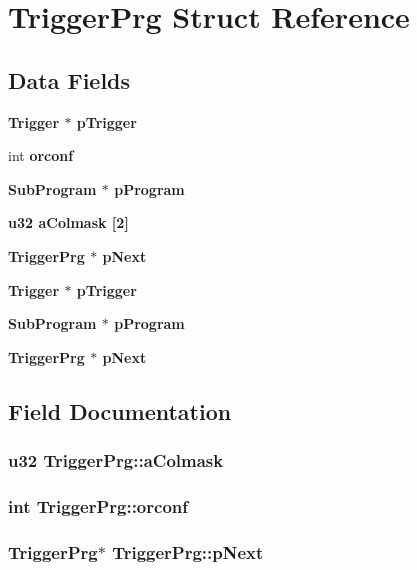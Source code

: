 \section{Trigger\-Prg Struct Reference}
\label{structTriggerPrg}
\subsection*{Data Fields}
\begin{CompactItemize}
\item 
\bf{Trigger} $\ast$ \bf{p\-Trigger}
\item 
int \bf{orconf}
\item 
\bf{Sub\-Program} $\ast$ \bf{p\-Program}
\item 
\bf{u32} \bf{a\-Colmask} [2]
\item 
\bf{Trigger\-Prg} $\ast$ \bf{p\-Next}
\item 
\bf{Trigger} $\ast$ \bf{p\-Trigger}
\item 
\bf{Sub\-Program} $\ast$ \bf{p\-Program}
\item 
\bf{Trigger\-Prg} $\ast$ \bf{p\-Next}
\end{CompactItemize}


\subsection{Field Documentation}
\subsubsection{\setlength{\rightskip}{0pt plus 5cm}\bf{u32} \bf{Trigger\-Prg::a\-Colmask}}\label{structTriggerPrg_6c5df8b228de3e02e3f84b711b8be34f}


\subsubsection{\setlength{\rightskip}{0pt plus 5cm}int \bf{Trigger\-Prg::orconf}}\label{structTriggerPrg_f73bf1993cb9f058a8a111435d32cdbc}


\subsubsection{\setlength{\rightskip}{0pt plus 5cm}\bf{Trigger\-Prg}$\ast$ \bf{Trigger\-Prg::p\-Next}}\label{structTriggerPrg_60842b3fb3f146014386ccaaec229462}


